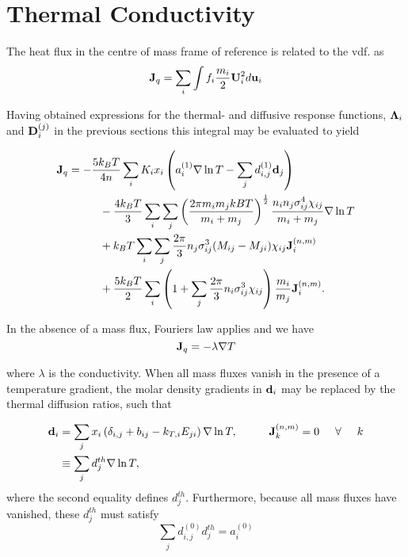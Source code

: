 \section{Thermal Conductivity}

The heat flux in the centre of mass frame of reference is related to the vdf. as
\begin{equation}
    \boldsymbol{\mathrm{J}}_q = \sum_i \int f_i \frac{m_i}{2}\boldsymbol{\mathrm{U}}_i^2 d\boldsymbol{\mathrm{u}}_i
\end{equation}

Having obtained expressions for the thermal- and diffusive response functions, $\boldsymbol{\mathrm{\Lambda}}_i$ and $\boldsymbol{\mathrm{D}}_i^{(j)}$ in the previous sections this integral may be evaluated to yield

\begin{equation}
    \begin{split}
        \boldsymbol{\mathrm{J}}_q &= - \frac{5 k_B T}{4n} \sum_i K_i x_i \left( a_i^{(1)} \nabla \ln T - \sum_j d_{i,j}^{(1)} \boldsymbol{\mathrm{d}}_j\right) \\
        &\hspace{1cm} - \frac{4 k_B T}{3} \sum_i \sum_j \left(\frac{2\pi m_i m_j kB T}{m_i + m_j}\right)^{\frac{1}{2}} \frac{n_i n_j \sigma_{ij}^4 \chi_{ij}}{m_i + m_j} \nabla \ln T\\
        &\hspace{1cm} + k_B T \sum_i \sum_j \frac{2 \pi}{3} n_j \sigma_{ij}^3 (M_{ij} - M_{ji})\chi_{ij}\boldsymbol{\mathrm{J}}^{(n,m)}_i\\
        &\hspace{1cm} + \frac{5 k_B T}{2} \sum_i \left( 1 + \sum_j\frac{2 \pi}{3} n_i \sigma_{ij}^3\chi_{ij}\right) \frac{m_i}{m_j} \boldsymbol{\mathrm{J}}^{(n,m)}_i.
    \end{split}
    \label{eq:heat_flux_general}
\end{equation}

In the absence of a mass flux, Fouriers law applies and we have
\begin{equation}
    \boldsymbol{\mathrm{J}}_q = - \lambda \nabla T
    \label{eq:fouriers_law}
\end{equation}

where $\lambda$ is the conductivity. When all mass fluxes vanish in the presence of a temperature gradient, the molar density gradients in $\boldsymbol{\mathrm{d}}_i$ may be replaced by the thermal diffusion ratios, such that

\begin{equation}
    \begin{split}
        \boldsymbol{\mathrm{d}}_i &= \sum_j x_i \left( \delta_{i,j} + b_{ij} - k_{T,i} E_{ji} \right)  \nabla \ln T, \hspace{1cm} \boldsymbol{\mathrm{J}}^{(n,m)}_k = 0 \hspace{.5cm} \forall \hspace{.5cm} k\\
        &\equiv \sum_j d_j^{th} \nabla \ln T,
    \end{split} 
\end{equation}
where the second equality defines $d_j^{th}$. Furthermore, because all mass fluxes have vanished, these $d_j^{th}$ must satisfy
\begin{equation}
    \sum_j d_{i,j}^{(0)} d_j^{th} = a_i^{(0)} 
\end{equation}

